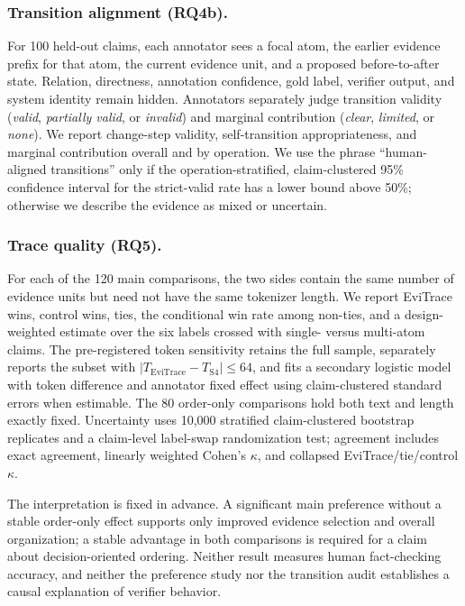 \documentclass[letterpaper]{article}
\begin{document}
\subsubsection{Transition alignment (RQ4b).}

For 100 held-out claims, each annotator sees a focal atom, the earlier
evidence prefix for that atom, the current evidence unit, and a proposed
before-to-after state. Relation, directness, annotation confidence, gold
label, verifier output, and system identity remain hidden. Annotators
separately judge transition validity
(\emph{valid}, \emph{partially valid}, or \emph{invalid}) and marginal
contribution (\emph{clear}, \emph{limited}, or \emph{none}). We report
change-step validity, self-transition appropriateness, and marginal
contribution overall and by operation. We use the phrase
``human-aligned transitions'' only if the operation-stratified,
claim-clustered 95\% confidence interval for the strict-valid rate has a
lower bound above 50\%; otherwise we describe the evidence as mixed or
uncertain.

\subsubsection{Trace quality (RQ5).}

For each of the 120 main comparisons, the two sides contain the same
number of evidence units but need not have the same tokenizer length.
We report EviTrace wins, control wins, ties, the conditional win rate
among non-ties, and a design-weighted estimate over the six labels
crossed with single- versus multi-atom claims. The pre-registered token
sensitivity retains the full sample, separately reports the subset with
\(\lvert T_{\mathrm{EviTrace}}-T_{\mathrm{S4}}\rvert\le64\), and fits a
secondary logistic model with token difference and annotator fixed
effect using claim-clustered standard errors when estimable. The 80
order-only comparisons hold both text and length exactly fixed.
Uncertainty uses 10,000 stratified claim-clustered bootstrap replicates
and a claim-level label-swap randomization test; agreement includes
exact agreement, linearly weighted Cohen's \(\kappa\), and collapsed
EviTrace/tie/control \(\kappa\).


The interpretation is fixed in advance. A significant main preference
without a stable order-only effect supports only improved evidence
selection and overall organization; a stable advantage in both
comparisons is required for a claim about decision-oriented ordering.
Neither result measures human fact-checking accuracy, and neither the
preference study nor the transition audit establishes a causal
explanation of verifier behavior.
\end{document}
